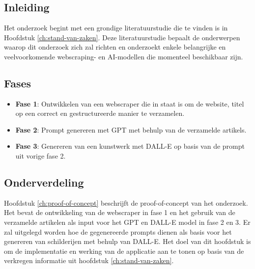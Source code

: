 
\chapter{}%
\label{ch:methodologie}

\section{Inleiding}
Het onderzoek begint met een grondige literatuurstudie die te vinden is in Hoofdstuk \ref{ch:stand-van-zaken}. Deze literatuurstudie bepaalt de onderwerpen waarop dit onderzoek zich zal richten en onderzoekt enkele belangrijke en veelvoorkomende webscraping- en AI-modellen die momenteel beschikbaar zijn.  \\

\section{Fases}
\begin{itemize}
    \item \textbf{Fase 1}: Ontwikkelen van een webscraper die in staat is om de website, titel op een correct en gestructureerde manier te verzamelen. 
    \item \textbf{Fase 2}: Prompt genereren met GPT met behulp van de verzamelde artikels. 
    \item \textbf{Fase 3}: Genereren van een kunstwerk met DALL-E op basis van de prompt uit vorige fase 2.
\end{itemize} 

\section{Onderverdeling}

Hoofdstuk \ref{ch:proof-of-concept}  beschrijft de proof-of-concept van het onderzoek. Het bevat de ontwikkeling van de webscraper in fase 1 en het gebruik van de verzamelde artikelen als input voor het GPT en DALL-E model in fase 2 en 3. Er zal uitgelegd worden hoe de gegenereerde prompts dienen als basis voor het genereren van schilderijen met behulp van DALL-E. Het doel van dit hoofdstuk is om de implementatie en werking van de applicatie aan te tonen op basis van de verkregen informatie uit hoofdstuk \ref{ch:stand-van-zaken}.  \\

